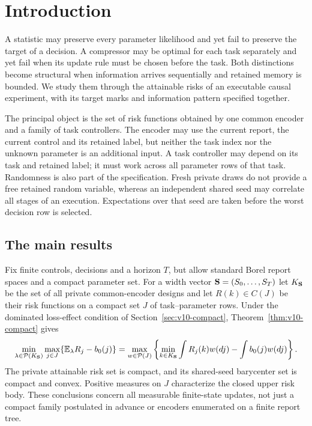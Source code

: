 \section{Introduction}
\label{sec:v10-introduction}

A statistic may preserve every parameter likelihood and yet fail to
preserve the target of a decision. A compressor may be optimal for
each task separately and yet fail when its update rule must be chosen
before the task. Both distinctions become structural when information
arrives sequentially and retained memory is bounded. We study them
through the attainable risks of an executable causal experiment,
with its target marks and information pattern specified together.

The principal object is the set of risk functions obtained by one
common encoder and a family of task controllers. The encoder may use
the current report, the current control and its retained label, but
neither the task index nor the unknown parameter is an additional
input. A task controller may depend on its task and retained label;
it must work across all parameter rows of that task. Randomness is
also part of the specification. Fresh private draws do not provide
a free retained random variable, whereas an independent shared seed
may correlate all stages of an execution. Expectations over that seed
are taken before the worst decision row is selected.

\subsection{The main results}
Fix finite controls, decisions and a horizon $T$, but allow standard
Borel report spaces and a compact parameter set. For a width vector
${\bf S}=(S_0,\ldots,S_T)$ let $K_{\bf S}$ be the set of all private
common-encoder designs and let $R(k)\in C(J)$ be their risk functions
on a compact set $J$ of task--parameter rows. Under the dominated
loss-effect condition of Section~\ref{sec:v10-compact},
Theorem~\ref{thm:v10-compact} gives
\begin{equation}\label{eq:v10-intro-dual}
 \min_{\lambda\in\mathcal P(K_{\bf S})}\max_{j\in J}
       \{\mathbb E_\lambda R_j-b_0(j)\}
 =\max_{w\in\mathcal P(J)}
       \left\{\min_{k\in K_{\bf S}}\int R_j(k)w(dj)
                        -\int b_0(j)w(dj)\right\}.
\end{equation}
The private attainable risk set is compact, and its shared-seed
barycenter set is compact and convex. Positive measures on $J$
characterize the closed upper risk body. These conclusions concern
all measurable finite-state updates, not just a compact family
postulated in advance or encoders enumerated on a finite report tree.

